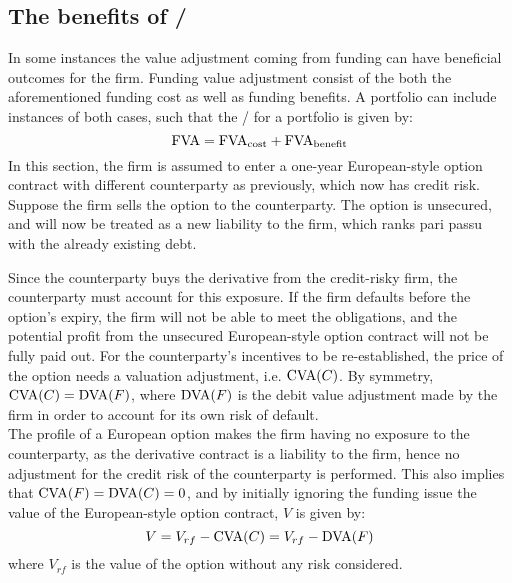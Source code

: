 \documentclass[../main.tex]{subfiles}
\begin{document}
    \subsection{The benefits of \FVA/}
        In some instances the value adjustment coming from funding can have beneficial outcomes for the firm. Funding value adjustment consist of the both the aforementioned funding cost as well as funding benefits. A portfolio can include instances of both cases, such that the \FVA/ for a portfolio is given by:
        \begin{equation}
            \text{\FVA/} = \text{\FVA/}_{\text{cost}} + \text{\FVA/}_{\text{benefit}}
        \end{equation}
        In this section, the firm is assumed to enter a one-year European-style option contract with different counterparty as previously,
        which now has credit risk.
        Suppose the firm sells the option to the counterparty. The option is unsecured, and will now be treated as a new liability to the firm, which ranks pari passu with the already existing debt.

        Since the counterparty buys the derivative from the credit-risky firm, the counterparty must account for this exposure. If the firm defaults before the option's expiry, the firm will not be able to meet the obligations, and the potential profit from the unsecured European-style option contract will not be fully paid out. For the counterparty's incentives to be re-established, the price of the option needs a valuation adjustment, i.e. $\text{\CVA/}(C)$. By symmetry, $\text{\CVA/}(C) = \text{\DVA/}(F)$, where $\text{\DVA/}(F)$ is the debit value adjustment made by the firm in order to account for its own risk of default.\\
        The profile of a European option makes the firm having no exposure to the counterparty, as the derivative contract is a liability to the firm, hence no adjustment for the credit risk of the counterparty is performed. This also implies that $\text{\CVA/}(F) = \text{\DVA/}(C) = 0$, and by initially ignoring the funding issue the value of the European-style option contract, $V$ is given by:
        \begin{equation}\label{eqn:option-value-credit-risk}
            V = V_{rf} - \text{\CVA/}(C) = V_{rf} - \text{\DVA/}(F)
        \end{equation}
        where $V_{rf}$ is the value of the option without any risk considered.
\end{document}
